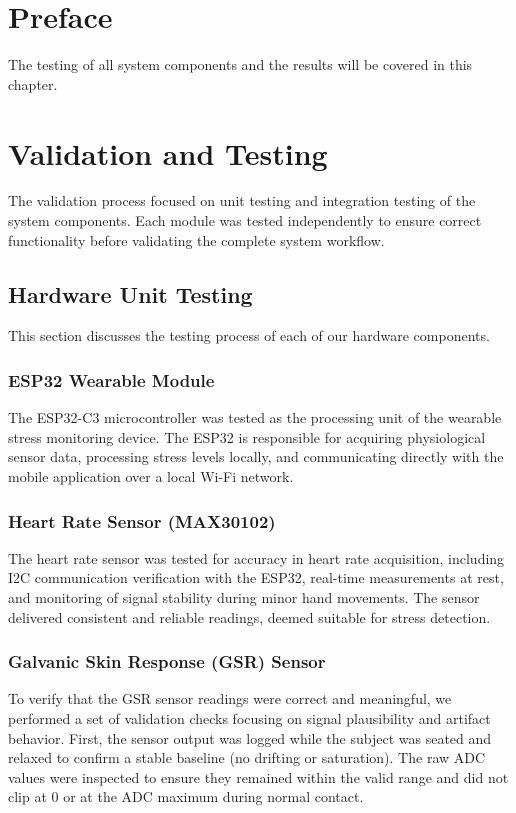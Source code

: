 \documentclass[a4paper,12pt]{report}
\begin{document}
\section{Preface }
The testing of all system components and the results will be covered in this chapter. 

\section{Validation and Testing}
The validation process focused on unit testing and integration testing of the system components. Each module was tested independently to ensure correct functionality before validating the complete system workflow.
\subsection{Hardware Unit Testing}
This section discusses the testing process of each of our hardware components.

\subsubsection{ESP32 Wearable Module}
The ESP32-C3 microcontroller was tested as the processing unit of the wearable stress monitoring device. The ESP32 is responsible for acquiring physiological sensor data, processing stress levels locally, and communicating directly with the mobile application over a local Wi-Fi network.

\subsubsection{Heart Rate Sensor (MAX30102)}
The heart rate sensor was tested for accuracy in heart rate acquisition, including I2C communication verification with the ESP32, real-time measurements at rest, and monitoring of signal stability during minor hand movements. The sensor delivered consistent and reliable readings, deemed suitable for stress detection.

\subsubsection{Galvanic Skin Response (GSR) Sensor}
To verify that the GSR sensor readings were correct and meaningful, we performed a set of validation checks focusing on signal plausibility and artifact behavior. First, the sensor output was logged while the subject was seated and relaxed to confirm a stable baseline (no drifting or saturation). The raw ADC values were inspected to ensure they remained within the valid range and did not clip at 0 or at the ADC maximum during normal contact.
\end{document}
